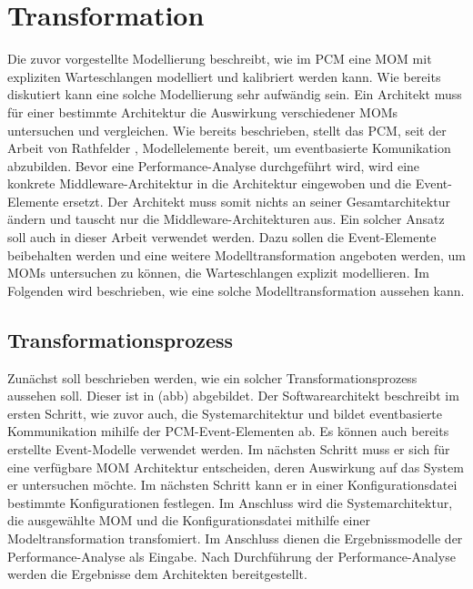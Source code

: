 
\chapter{Transformation}
\label{ch:transformation}
Die zuvor vorgestellte Modellierung beschreibt, wie im PCM eine MOM mit expliziten Warteschlangen modelliert und kalibriert werden kann. Wie bereits diskutiert kann eine solche Modellierung sehr aufwändig sein. Ein Architekt muss für einer bestimmte Architektur die Auswirkung verschiedener MOMs untersuchen und vergleichen. Wie bereits beschrieben, stellt das PCM, seit der Arbeit von Rathfelder \cite{Rathfelder2013}, Modellelemente bereit, um eventbasierte Komunikation abzubilden. Bevor eine Performance-Analyse durchgeführt wird, wird eine konkrete Middleware-Architektur in die Architektur eingewoben und die Event-Elemente ersetzt. Der Architekt muss somit nichts an seiner Gesamtarchitektur ändern und tauscht nur die Middleware-Architekturen aus. Ein solcher Ansatz soll auch in dieser Arbeit verwendet werden. Dazu sollen die Event-Elemente beibehalten werden und eine weitere Modelltransformation angeboten werden, um MOMs untersuchen zu können, die Warteschlangen explizit modellieren. Im Folgenden wird beschrieben, wie eine solche Modelltransformation aussehen kann.
\section{Transformationsprozess}
Zunächst soll beschrieben werden, wie ein solcher Transformationsprozess aussehen soll. Dieser ist in (abb) abgebildet. Der Softwarearchitekt beschreibt im ersten Schritt, wie zuvor auch, die Systemarchitektur und bildet eventbasierte Kommunikation mihilfe der PCM-Event-Elementen ab. Es können auch bereits erstellte Event-Modelle verwendet werden. Im nächsten Schritt muss er sich für eine verfügbare MOM Architektur entscheiden, deren Auswirkung auf das System er untersuchen möchte. Im nächsten Schritt kann er in einer Konfigurationsdatei bestimmte Konfigurationen festlegen. Im Anschluss wird die Systemarchitektur, die ausgewählte MOM und die Konfigurationsdatei mithilfe einer Modeltransformation transfomiert. Im Anschluss dienen die Ergebnissmodelle der Performance-Analyse als Eingabe. Nach Durchführung der Performance-Analyse werden die Ergebnisse dem Architekten bereitgestellt.

